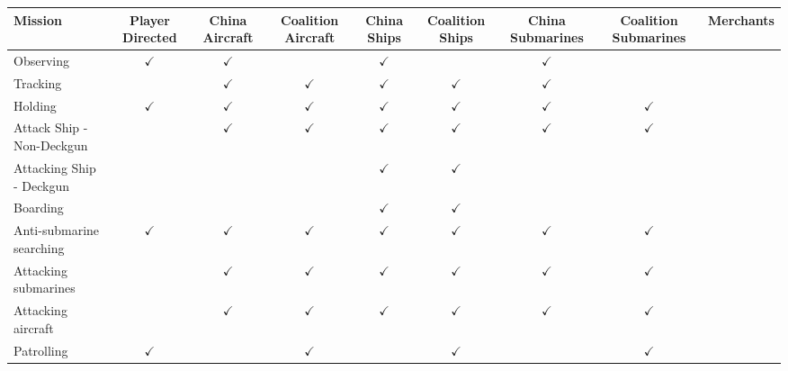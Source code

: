 \documentclass{article}
\begin{document}
\begin{center}
\begin{adjustbox}{max width=\textwidth,center}
\begin{tabular}{lcccccccc}
\toprule
\rowcolor{gray!20}
\textbf{Mission} & \textbf{Player Directed} & \textbf{China Aircraft} & \textbf{Coalition Aircraft} & \textbf{China Ships} & \textbf{Coalition Ships} & \textbf{China Submarines} & \textbf{Coalition Submarines} & \textbf{Merchants} \\
\midrule
\rowcolor{gray!10}
Observing   &$\checkmark$   & $\checkmark$  &   &   $\checkmark$      &              & $\checkmark$        &      &       \\
\rowcolor{gray!5}
Tracking   &            & $\checkmark$            & $\checkmark$  & $\checkmark$         & $\checkmark$             & $\checkmark$         &       &     \\
\rowcolor{gray!10}
Holding    & $\checkmark$ & $\checkmark$       & $\checkmark$  & $\checkmark$         & $\checkmark$             & $\checkmark$         & $\checkmark$     &       \\
\rowcolor{gray!5}
Attack Ship - Non-Deckgun &            &  $\checkmark$ & $\checkmark$  & $\checkmark$         & $\checkmark$             & $\checkmark$         & $\checkmark$     &     \\
\rowcolor{gray!10}
Attacking Ship - Deckgun &            &            &  & $\checkmark$         & $\checkmark$             &         &       &     \\
\rowcolor{gray!5}
Boarding   &            &            &  &    $\checkmark$     & $\checkmark$             &         &      &     \\
\rowcolor{gray!10}
Anti-submarine searching & $\checkmark$            & $\checkmark$            & $\checkmark$  &  $\checkmark$        & $\checkmark$        & $\checkmark$  & $\checkmark$    &     \\
\rowcolor{gray!5}
Attacking submarines    &            & $\checkmark$ & $\checkmark$  & $\checkmark$ & $\checkmark$             & $\checkmark$         & $\checkmark$     &     \\
\rowcolor{gray!10}
Attacking aircraft      &            & $\checkmark$    &$\checkmark$  & $\checkmark$         & $\checkmark$             & $\checkmark$ & $\checkmark$ &     \\
\rowcolor{gray!5}
Patrolling & $\checkmark$            &             & $\checkmark$ &      & $\checkmark$             &         &  $\checkmark$     &     \\

\end{tabular}
\end{adjustbox}
\end{center}
\end{document}
